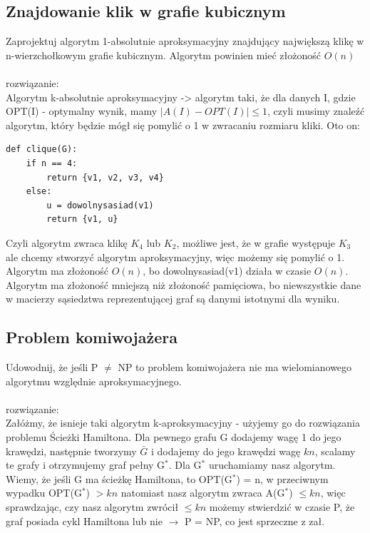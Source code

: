 \documentclass{article}
\begin{document}
\subsection*{Znajdowanie klik w grafie kubicznym}
Zaprojektuj algorytm 1-absolutnie aproksymacyjny znajdujący największą klikę w n-wierzchołkowym grafie kubicznym. Algorytm powinien mieć złożoność $O(n)$ \\\\rozwiązanie:\\
Algorytm k-absolutnie aproksymacyjny -> algorytm taki, że dla danych I, gdzie OPT(I) - optymalny wynik, mamy $|A(I) - OPT(I)| \leq 1$, czyli musimy znaleźć algorytm, 
który będzie mógł się pomylić o 1 w zwracaniu rozmiaru kliki. Oto on:

\begin{lstlisting}
def clique(G):
	if n == 4:
		return {v1, v2, v3, v4}
	else:
		u = dowolnysasiad(v1)
		return {v1, u}
\end{lstlisting}
Czyli algorytm zwraca klikę $K_4$ lub $K_2$,  możliwe jest, że w grafie występuje $K_3$ ale chcemy stworzyć algorytm aproksymacyjny, więc możemy się pomylić o 1.
Algorytm ma złożoność $O(n)$, bo dowolnysasiad(v1) działa w czasie $O(n)$. Algorytm ma złożoność mniejszą niż złożoność pamięciowa, bo niewszystkie dane w macierzy 
sąsiedztwa reprezentującej graf są danymi istotnymi dla wyniku.

\subsection*{Problem komiwojażera}
Udowodnij, że jeśli P $\ne$ NP to problem komiwojażera nie ma wielomianowego algorytmu względnie aproksymacyjnego. \\\\rozwiązanie:\\
Załóżmy, że isnieje taki algorytm k-aproksymacyjny - użyjemy go do rozwiązania problemu Ścieżki Hamiltona. 
Dla pewnego grafu G dodajemy wagę 1 do jego krawędzi, następnie tworzymy $\bar{G}$
i dodajemy do jego krawędzi wagę $kn$, scalamy te grafy i otrzymujemy graf pełny G$^*$. Dla G$^*$ uruchamiamy nasz algorytm.
Wiemy, że jeśli G ma ścieżkę Hamiltona, to OPT(G$^*$) = n, w przeciwnym wypadku OPT(G$^*$) $> kn$ natomiast nasz algorytm zwraca A(G$^*$) $\leq kn$,
więc sprawdzając, czy nasz algorytm zwrócił $\leq kn$ możemy stwierdzić w czasie P, że graf posiada cykl Hamiltona lub nie $\rightarrow$ P = NP, co jest sprzeczne z zał.
\end{document}
